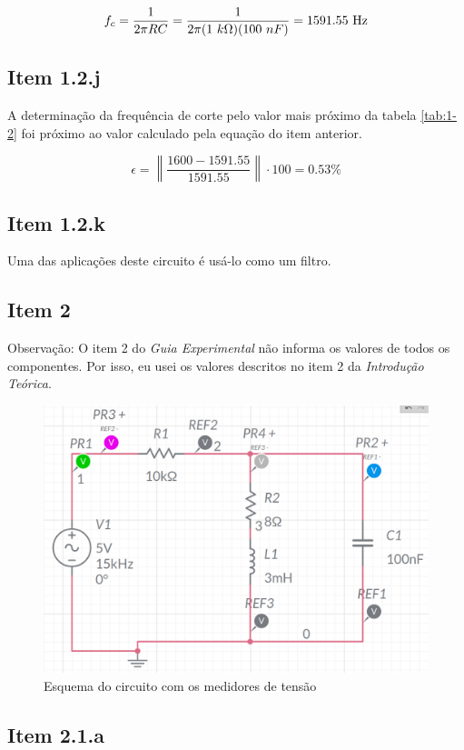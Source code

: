 \documentclass[11pt]{article}
\begin{document}
$$
  f_{c} = \frac{1}{2\pi RC} = \frac{1}{2\pi (1\ k\Omega)(100\ nF)} = 1591.55\ \textnormal{Hz}
$$

\subsection*{Item 1.2.j}

A determinação da frequência de corte pelo valor mais próximo da tabela \ref{tab:1-2} foi próximo ao valor calculado pela equação do item anterior.

$$
  \epsilon = \left\|\frac{1600 - 1591.55}{1591.55}\right\| \cdot 100 = 0.53\%
$$

\subsection*{Item 1.2.k}

Uma das aplicações deste circuito é usá-lo como um filtro.

\subsection*{Item 2}

Observação: O item 2 do \emph{Guia Experimental} não informa os valores de todos os componentes. Por isso, eu usei os valores descritos no item 2 da \emph{Introdução Teórica}.

\begin{figure}[h!]
  \centering
  \includegraphics[width=.82\textwidth]{fig/2_circuito}
  \caption{Esquema do circuito com os medidores de tensão}
  \label{fig:circ2}
\end{figure}

\subsection*{Item 2.1.a}
\end{document}

